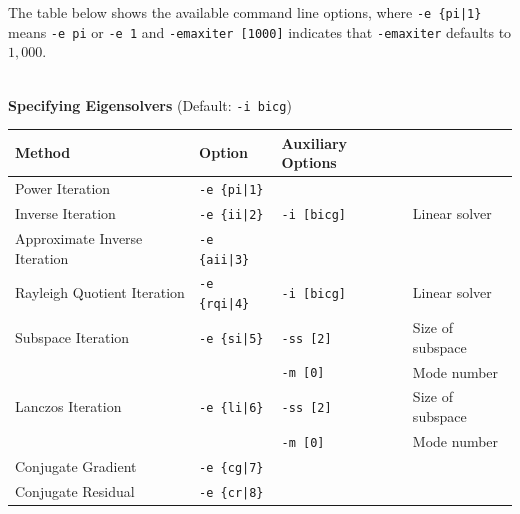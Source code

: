 \documentclass[a4paper]{article}
\begin{document}
The table below shows the available command line options, 
where \verb=-e {pi|1}= means \verb=-e pi= or \verb=-e 1= and \verb=-emaxiter [1000]= indicates 
that \verb=-emaxiter= defaults to $1,000$.
\\
\\
\begin{minipage}[t]{\textwidth}
\begin{center}
{\bf Specifying Eigensolvers} (Default: \verb=-i bicg=) \\
\begin{tabular}{l|lll}\hline\hline
 Method      & Option              &  Auxiliary Options  & \\ \hline
\hline
 Power Iteration                            & \verb=-e {pi|1}=        &    \\ 
 Inverse Iteration                          & \verb=-e {ii|2}=        &
 \verb=-i [bicg]= & Linear solver \\
 Approximate Inverse Iteration              & \verb=-e {aii|3}=       &    \\
 Rayleigh Quotient Iteration                & \verb=-e {rqi|4}=       &    \verb=-i [bicg]= & Linear solver \\
 Subspace Iteration                         & \verb=-e {si|5}=        &    \verb=-ss [2]= & Size of subspace \\
                                            &                         &
 \verb=-m [0]= & Mode number\\
 Lanczos Iteration                          & \verb=-e {li|6}=        &    \verb=-ss [2]= & Size of subspace \\
                                            &                         &
 \verb=-m [0]= & Mode number\\
 Conjugate Gradient                         & \verb=-e {cg|7}=        &    \\
 Conjugate Residual                         & \verb=-e {cr|8}=        &    \\
\hline         
\end{tabular}
\end{center}
\end{minipage}
\\ \\
\end{document}
